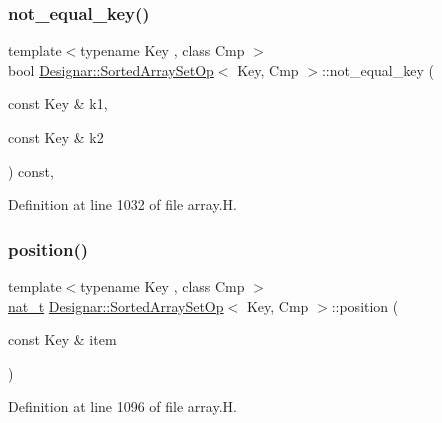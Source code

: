 \subsubsection{\texorpdfstring{not\+\_\+equal\+\_\+key()}{not\_equal\_key()}}
{\footnotesize\ttfamily template$<$typename Key , class Cmp $>$ \\
bool \hyperlink{class_designar_1_1_sorted_array_set_op}{Designar\+::\+Sorted\+Array\+Set\+Op}$<$ Key, Cmp $>$\+::not\+\_\+equal\+\_\+key (\begin{DoxyParamCaption}\item[{const Key \&}]{k1,  }\item[{const Key \&}]{k2 }\end{DoxyParamCaption}) const\hspace{0.3cm}{\ttfamily [inline]}, {\ttfamily [protected]}}



Definition at line 1032 of file array.\+H.

\mbox{\label{class_designar_1_1_sorted_array_set_op_a138b326d0002cf3ddc19a980b1ca9542}} 
\subsubsection{\texorpdfstring{position()}{position()}}
{\footnotesize\ttfamily template$<$typename Key , class Cmp $>$ \\
\hyperlink{namespace_designar_aa72662848b9f4815e7bf31a7cf3e33d1}{nat\+\_\+t} \hyperlink{class_designar_1_1_sorted_array_set_op}{Designar\+::\+Sorted\+Array\+Set\+Op}$<$ Key, Cmp $>$\+::position (\begin{DoxyParamCaption}\item[{const Key \&}]{item }\end{DoxyParamCaption})\hspace{0.3cm}{\ttfamily [inline]}}



Definition at line 1096 of file array.\+H.

\mbox{\label{class_designar_1_1_sorted_array_set_op_aa0ea019290a9b4a4777b5beb4c4d0c7d}} 

